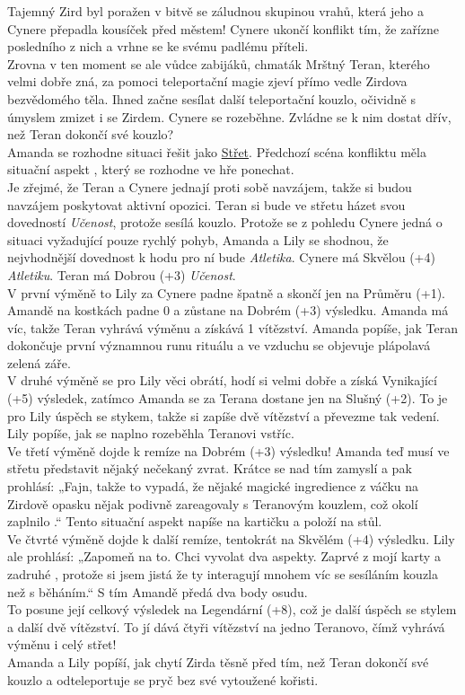 Tajemný Zird byl poražen v bitvě se záludnou skupinou vrahů, která jeho a Cynere přepadla kousíček před městem! Cynere ukončí konflikt tím, že zařízne posledního z nich a vrhne se ke svému padlému příteli. \\
Zrovna v ten moment se ale vůdce zabijáků, chmaták Mrštný Teran, kterého velmi dobře zná, za pomoci teleportační magie zjeví přímo vedle Zirdova bezvědomého těla. Ihned začne sesílat další teleportační kouzlo, očividně s úmyslem zmizet i se Zirdem. Cynere se rozeběhne. Zvládne se k nim dostat dřív, než Teran dokončí své kouzlo?\\
Amanda se rozhodne situaci řešit jako \underline{Střet}. Předchozí scéna konfliktu měla situační aspekt , který se rozhodne ve hře ponechat.\\
Je zřejmé, že Teran a Cynere jednají proti sobě navzájem, takže si budou navzájem poskytovat aktivní opozici. Teran si bude ve střetu házet svou dovedností \textit{Učenost}, protože sesílá kouzlo. Protože se z pohledu Cynere jedná o situaci vyžadující pouze rychlý pohyb, Amanda a Lily se shodnou, že nejvhodnější dovednost k hodu pro ní bude \textit{Atletika}.
Cynere má Skvělou (+4) \textit{Atletiku}. Teran má Dobrou (+3) \textit{Učenost}.\\
V první výměně to Lily za Cynere padne špatně a skončí jen na Průměru (+1). Amandě na kostkách padne 0 a zůstane na Dobrém (+3) výsledku. Amanda má víc, takže Teran vyhrává výměnu a získává 1 vítězství. Amanda popíše, jak Teran dokončuje první významnou runu rituálu a ve vzduchu se objevuje plápolavá zelená záře.\\
V druhé výměně se pro Lily věci obrátí, hodí si velmi dobře a získá Vynikající (+5) výsledek, zatímco Amanda se za Terana dostane jen na Slušný (+2). To je pro Lily úspěch se stykem, takže si zapíše dvě vítězství a převezme tak vedení. Lily popíše, jak se naplno rozeběhla Teranovi vstříc.\\
Ve třetí výměně dojde k remíze na Dobrém (+3) výsledku! Amanda teď musí ve střetu představit nějaký nečekaný zvrat. Krátce se nad tím zamyslí a pak prohlásí: „Fajn, takže to vypadá, že nějaké magické ingredience z váčku na Zirdově opasku nějak podivně zareagovaly s Teranovým kouzlem, což okolí zaplnilo .“ Tento situační aspekt napíše na kartičku a položí na stůl. \\
Ve čtvrté výměně dojde k další remíze, tentokrát na Skvělém (+4) výsledku. Lily ale prohlásí: „Zapomeň na to. Chci vyvolat dva aspekty. Zaprvé  z mojí karty a zadruhé , protože si jsem jistá že ty interagují mnohem víc se sesíláním kouzla než s běháním.“ S tím Amandě předá dva body osudu.\\
To posune její celkový výsledek na Legendární (+8), což je další úspěch se stylem a další dvě vítězství. To jí dává čtyři vítězství na jedno Teranovo, čímž vyhrává výměnu i celý střet!\\
Amanda a Lily popíší, jak chytí Zirda těsně před tím, než Teran dokončí své kouzlo a odteleportuje se pryč bez své vytoužené kořisti.

